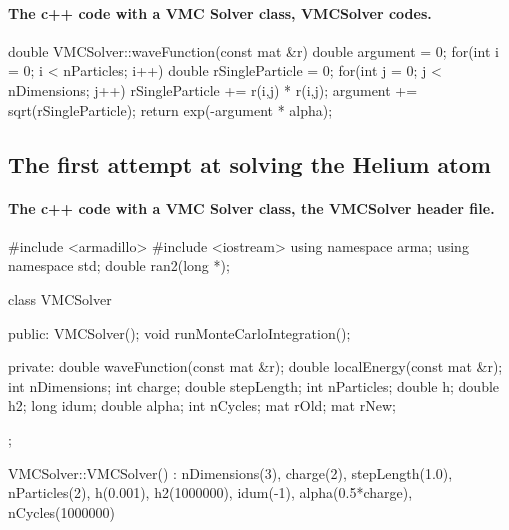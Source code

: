 \documentclass[%
twoside,                 %
final,                   %
10pt]{article}
\begin{document}
\paragraph{The c++ code with a VMC Solver class, VMCSolver codes.}

\bcppcod
double VMCSolver::waveFunction(const mat &r)
{
    double argument = 0;
    for(int i = 0; i < nParticles; i++) {
        double rSingleParticle = 0;
        for(int j = 0; j < nDimensions; j++) {
            rSingleParticle += r(i,j) * r(i,j);
        }
        argument += sqrt(rSingleParticle);
    }
    return exp(-argument * alpha);
}
\ecppcod




\subsection{The first attempt at solving the Helium atom}

\paragraph{The c++ code with a VMC Solver class, the VMCSolver header file.}

\bcppcod
#include <armadillo>
#include <iostream>
using namespace arma;
using namespace std;
double ran2(long *);

class VMCSolver
{
public:
    VMCSolver();
    void runMonteCarloIntegration();

private:
    double waveFunction(const mat &r);
    double localEnergy(const mat &r);
    int nDimensions;
    int charge;
    double stepLength;
    int nParticles;
    double h;
    double h2;
    long idum;
    double alpha;
    int nCycles;
    mat rOld;
    mat rNew;
};

VMCSolver::VMCSolver() :
    nDimensions(3),
    charge(2),
    stepLength(1.0),
    nParticles(2),
    h(0.001),
    h2(1000000),
    idum(-1),
    alpha(0.5*charge),
    nCycles(1000000)
{
}
\end{document}
